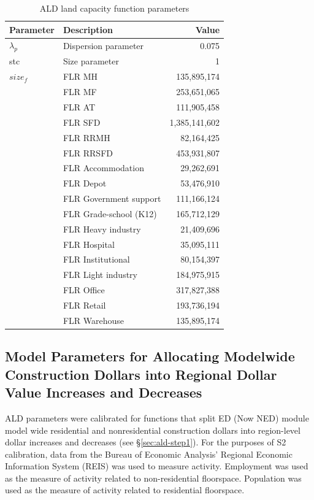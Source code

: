 \begin{table}[!t]  %
\centering
\caption{ALD land capacity function parameters}\label{tab:land-capacity-parameters}
\begin{tabular}{llr}
\hline
Parameter & Description & Value \\
\hline
$\lambda_p$ & Dispersion parameter & 0.075 \\
stc & Size parameter & 1 \\
$size_f$ & FLR MH & 135,895,174 \\
 & FLR MF & 253,651,065 \\
 & FLR AT & 111,905,458 \\
 & FLR SFD & 1,385,141,602 \\
 & FLR RRMH & 82,164,425 \\
 & FLR RRSFD & 453,931,807 \\
 & FLR Accommodation & 29,262,691 \\
 & FLR Depot & 53,476,910 \\
 & FLR Government support & 111,166,124 \\
 & FLR Grade-school (K12) & 165,712,129 \\
 & FLR Heavy industry & 21,409,696 \\
 & FLR Hospital & 35,095,111 \\
 & FLR Institutional & 80,154,397 \\
 & FLR Light industry & 184,975,915 \\
 & FLR Office & 317,827,388 \\
 & FLR Retail & 193,736,194 \\
 & FLR Warehouse & 135,895,174 \\
\hline
\end{tabular}
\end{table}


\subsection{Model Parameters for Allocating Modelwide Construction Dollars into Regional Dollar Value Increases and Decreases}\label{sec:ald-increase-decrease}   %
ALD parameters were calibrated for functions that split ED (Now NED) module model wide residential and nonresidential construction dollars into region-level dollar increases and decreases (see \S\ref{sec:ald-step1}). For the purposes of S2 calibration, data from the Bureau of Economic Analysis' Regional Economic Information System (REIS) was used to measure activity. Employment was used as the measure of activity related to non-residential floorspace. Population was used as the measure of activity related to residential floorspace.

